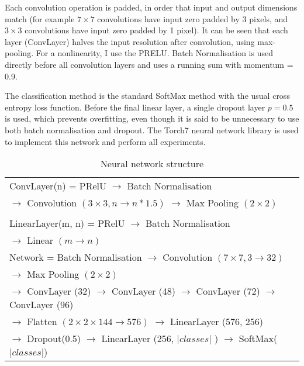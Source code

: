 Each convolution operation is padded, in order that input and output dimensions match (for example $ 7\times7 $ convolutions have input zero padded by 3 pixels, and $3\times3$ convolutions have input zero padded by 1 pixel). It can be seen that each layer (ConvLayer) halves the input resolution after convolution, using max-pooling. For a nonlinearity, I use the \gls{PRELU}. Batch Normalisation is used directly before all convolution layers and uses a running sum with momentum = 0.9.

The classification method is the standard SoftMax method with the usual cross entropy loss function. Before the final linear layer, a single dropout layer $ p = 0.5 $ is used, which prevents overfitting, even though it is said to be unnecessary to use both batch normalisation and dropout.  The Torch7 \cite{Collobert2011a} neural network library is used to implement this network and perform all experiments. 

\begin{table}[h]
  \centering
    \caption{Neural network structure }
\begin{tabular}{ l } 

\toprule

 ConvLayer(n) = PRelU $\rightarrow$ Batch Normalisation \\ 
 $\rightarrow$  Convolution $(3\times3, n \rightarrow n * 1.5)$ $\rightarrow$  Max Pooling $(2\times2)$ \\
\\
 LinearLayer(m, n)  = PRelU $\rightarrow$ Batch Normalisation \\  $\rightarrow$  Linear $(m \rightarrow n)$ \\
\toprule
  Network = Batch Normalisation $\rightarrow$
 Convolution $(7\times7, 3 \rightarrow 32)$ \\
 $\rightarrow$ Max Pooling $(2\times2)$   \\

  $\rightarrow$ ConvLayer (32) $\rightarrow$  ConvLayer (48) $\rightarrow$ ConvLayer (72) $\rightarrow$ ConvLayer (96)   \\
  
  
  $\rightarrow$ Flatten $(2\times2\times144 \rightarrow 576)$ $\rightarrow$ LinearLayer (576, 256) \\
  
  $\rightarrow$ Dropout(0.5) $\rightarrow$ LinearLayer (256, $\vert classes \vert$ )  $\rightarrow$  SoftMax($\vert classes \vert$) \\
  
    
       
\toprule
\end{tabular}

\label{fig:focus_network}
\end{table}


